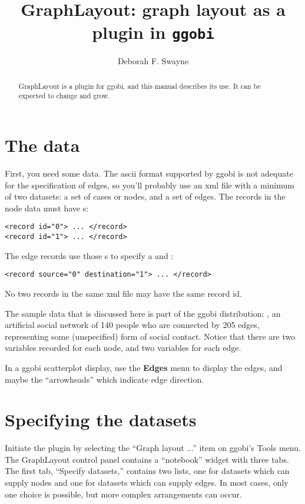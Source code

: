 \documentclass[11pt]{article}
\begin{document}
\title{GraphLayout: graph layout as a plugin in {\tt ggobi}}
\author{Deborah F. Swayne}
\maketitle

\begin{abstract}
GraphLayout is a plugin for ggobi, and this manual
describes its use.  It can be expected to change and grow.
\end{abstract}

\section{The data}

First, you need some data.  The ascii format supported by ggobi is not
adequate for the specification of edges, so you'll probably use an xml
file with a minimum of two datasets:  a set of cases or nodes, and a set
of edges.  The records in the node data must have
s:

\begin{verbatim}
<record id="0"> ... </record>
<record id="1"> ... </record>
\end{verbatim}

The edge records use those s to specify a
 and :

\begin{verbatim}
<record source="0" destination="1"> ... </record>
\end{verbatim}

No two records in the same xml file may have the same record id.

The sample data that is discussed here is part of the ggobi distribution:
, an artificial social network of 140 people who are
connected by 205 edges, representing some (unspecified) form of social
contact.  Notice that there are two variables recorded for each node,
and two variables for each edge.

In a ggobi scatterplot display, use the {\bf Edges} menu to
display the edges, and maybe the ``arrowheads'' which indicate
edge direction.

\section{Specifying the datasets}

Initiate the plugin by selecting the ``Graph layout ...'' item on ggobi's
Tools menu.  The GraphLayout control panel contains a ``notebook''
widget with three tabs.  The first tab, ``Specify datasets,'' contains
two lists, one for datasets which can supply nodes and one for datasets
which can supply edges.  In most cases, only one choice is possible,
but more complex arrangements can occur.
\end{document}
